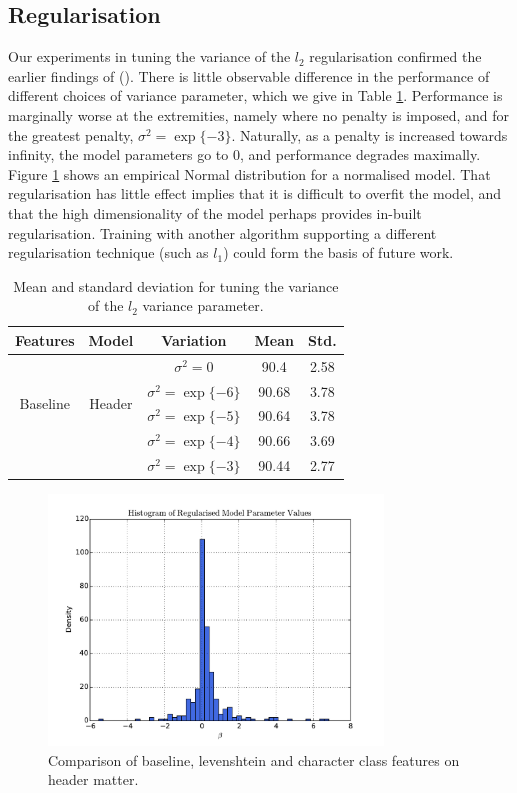 \subsection{Regularisation}

Our experiments in tuning the variance of the $l_2$ regularisation confirmed the earlier findings of (\cite{Peng04accurateinformation}). There is little observable difference in the performance of different choices of variance parameter, which we give in Table \ref{table:regularisationresults}. Performance is marginally worse at the extremities, namely where no penalty is imposed, and for the greatest penalty, $\sigma^2 = \exp\{-3\}$. Naturally, as a penalty is increased towards infinity, the model parameters go to 0, and performance degrades maximally. Figure \ref{fig:histogram} shows an empirical Normal distribution for a normalised model. That regularisation has little effect implies that it is difficult to overfit the model, and that the high dimensionality of the model perhaps provides in-built regularisation. Training with another algorithm supporting a different regularisation technique (such as $l_1$) could form the basis of future work.

\begin{table}[h]
\begin{center}
\begin{tabular}{|c|c|c|c|c|}
\hline
Features & Model & Variation & Mean & Std.\\
\hline
\multirow{4}{*}{Baseline} & \multirow{4}{*}{Header} & $\sigma^2 = 0$ & 90.4 & 2.58\\
& & $\sigma^2 = \exp\{-6\}$ & 90.68 & 3.78\\
& & $\sigma^2 = \exp\{-5\}$ & 90.64 & 3.78\\
& & $\sigma^2 = \exp\{-4\}$ & 90.66 & 3.69\\
& & $\sigma^2 = \exp\{-3\}$ & 90.44 & 2.77\\
\hline
\end{tabular}
\caption[Mean and standard deviation for tuning the variance of the $l_2$ variance parameter.]{Mean and standard deviation for tuning the variance of the $l_2$ variance parameter.}
\label{table:regularisationresults}
\end{center}
\end{table}

\begin{figure}[h]
\center
\includegraphics[width=3.5in]{Figures/histogram.pdf}
\caption{Comparison of baseline, levenshtein and character class features on header matter.}
\label{fig:histogram}
\end{figure}

